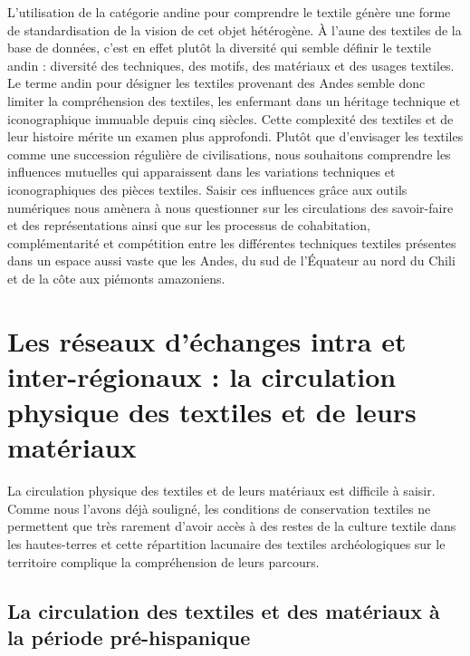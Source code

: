 L'utilisation de la catégorie \og andine \fg \:pour comprendre le textile génère une forme de standardisation de la vision de cet objet hétérogène. À l'aune des textiles de la base de données, c'est en effet plutôt la diversité qui semble définir le textile andin : diversité des techniques, des motifs, des matériaux et des usages textiles. \\

Le terme \og andin \fg \:pour désigner les textiles provenant des Andes semble donc limiter la compréhension des textiles, les enfermant dans un héritage technique et iconographique immuable depuis cinq siècles. Cette complexité des textiles et de leur histoire mérite un examen plus approfondi. Plutôt que d'envisager les textiles comme une succession régulière de civilisations, nous souhaitons comprendre les influences mutuelles qui apparaissent dans les variations techniques et iconographiques des pièces textiles. Saisir ces influences grâce aux outils numériques nous amènera à nous questionner sur les circulations des savoir-faire et des représentations ainsi que sur les processus de cohabitation, complémentarité et compétition entre les différentes techniques textiles présentes dans un espace aussi vaste que les Andes, du sud de l'Équateur au nord du Chili et de la côte aux piémonts amazoniens.






\section[Les réseaux d'échanges intra et inter-régionaux]{Les réseaux d'échanges intra et inter-régionaux : la circulation physique des textiles et de leurs matériaux}

La circulation physique des textiles et de leurs matériaux est difficile à saisir. Comme nous l'avons déjà souligné, les conditions de conservation textiles ne permettent que très rarement d'avoir accès à des restes de la culture textile dans les hautes-terres et cette répartition lacunaire des textiles archéologiques sur le territoire complique la compréhension de leurs parcours. 

\subsection{La circulation des textiles et des matériaux à la période pré-hispanique}

